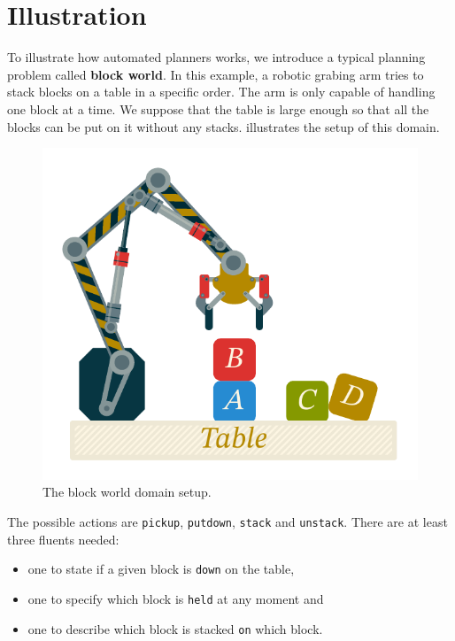 \documentclass[11pt,a4paper,twoside,openright,titlepage,numbers=noenddot,headinclude,cleardoublepage=empty,openany]{scrreprt}
\theoremstyle{plain}
\theoremstyle{definition}
\theoremstyle{remark}
\newcommand{\passthrough}[1]{#1}
\providecommand{\tightlist}{%
  \setlength{\itemsep}{0pt}\setlength{\parskip}{0pt}}
\begin{document}
\hypertarget{sec:plan_example}{%
\section{Illustration}\label{sec:plan_example}}

To illustrate how automated planners works, we introduce a typical
planning problem called \textbf{block world}. In this example, a robotic
grabing arm tries to stack blocks on a table in a specific order. The
arm is only capable of handling one block at a time. We suppose that the
table is large enough so that all the blocks can be put on it without
any stacks.  illustrates the setup of this domain.

\begin{figure}
\hypertarget{fig:blockworld}{%
\centering
\includegraphics{./tex2pdf.-0b80fea6fd6da7f9/1dcfce38727412c8d5b73e8ce4f3a8fdd0d7e331.pdf}
\caption{The block world domain setup.}\label{fig:blockworld}
}
\end{figure}

The possible actions are \passthrough{\lstinline!pickup!},
\passthrough{\lstinline!putdown!}, \passthrough{\lstinline!stack!} and
\passthrough{\lstinline!unstack!}. There are at least three fluents
needed:

\begin{itemize}
\tightlist
\item
  one to state if a given block is \passthrough{\lstinline!down!} on the
  table,
\item
  one to specify which block is \passthrough{\lstinline!held!} at any
  moment and
\item
  one to describe which block is stacked \passthrough{\lstinline!on!}
  which block.
\end{itemize}
\end{document}
